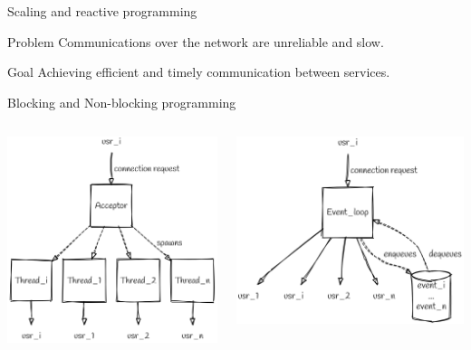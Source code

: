 \documentclass{beamer}
\begin{document}
\begin{frame}{Scaling and reactive programming}
    \begin{alertblock}{Problem}
        Communications over the network are unreliable and slow.
    \end{alertblock}
    \begin{block}{Goal}
        Achieving efficient and timely communication between services.
    \end{block}
\end{frame}
\begin{frame}{Blocking and Non-blocking programming}
    \begin{columns}
        \begin{column}{0.5\textwidth}
            \includegraphics[width=\textwidth]{assets/blocking.png}
        \end{column}
        \begin{column}{0.5\textwidth}
            \includegraphics[width=\textwidth]{assets/nonblocking.png}

\end{column}
\end{columns}
\end{frame}
\end{document}
